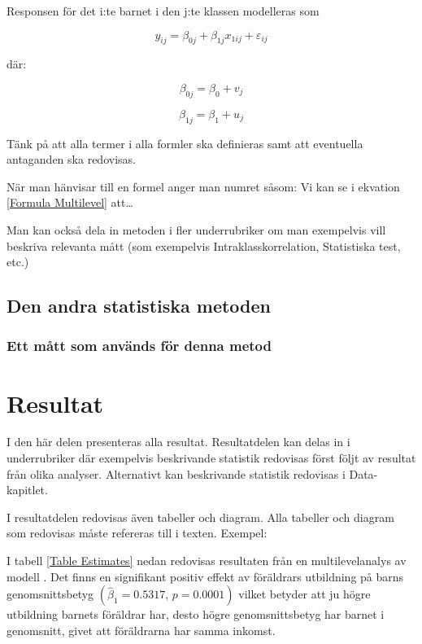 \documentclass[10pt,swedish]{book}
\begin{document}
Responsen för det i:te barnet i den j:te klassen modelleras som

\begin{equation}
y_{ij}=\beta_{0j}+\beta_{1j}x_{1ij}+\varepsilon_{ij}
\end{equation}
\label{Formula Multilevel}

där:

\[
\beta_{0j}=\beta_{0}+v_{j}
\]

\[
\beta_{1j}=\beta_{1}+u_{j}
\]

Tänk på att alla termer i alla formler ska definieras samt att eventuella
antaganden ska redovisas. 

När man hänvisar till en formel anger man numret såsom: Vi kan se
i ekvation \ref{Formula Multilevel} att\dots{} 

Man kan också dela in metoden i fler underrubriker om man exempelvis
vill beskriva relevanta mått (som exempelvis Intraklasskorrelation,
Statistiska test, etc.)

\section{Den andra statistiska metoden}

\lipsum[1-3]

\subsection{Ett mått som används för denna metod}

\lipsum[3-5]

\clearpage{}

\chapter{Resultat}

I den här delen presenteras alla resultat. Resultatdelen kan delas
in i underrubriker där exempelvis beskrivande statistik redovisas
först följt av resultat från olika analyser. Alternativt kan beskrivande
statistik redovisas i Data-kapitlet.

I resultatdelen redovisas även tabeller och diagram. Alla tabeller
och diagram som redovisas måste refereras till i texten. Exempel:

I tabell \ref{Table Estimates} nedan redovisas resultaten från en
multilevelanalys av modell . Det finns en signifikant positiv effekt
av föräldrars utbildning på barns genomsnittsbetyg $(\hat{\beta}_{1}=0.5317,\,p=0.0001)$
vilket betyder att ju högre utbildning barnets föräldrar har, desto
högre genomsnittsbetyg har barnet i genomsnitt, givet att föräldrarna
har samma inkomst.
\end{document}
